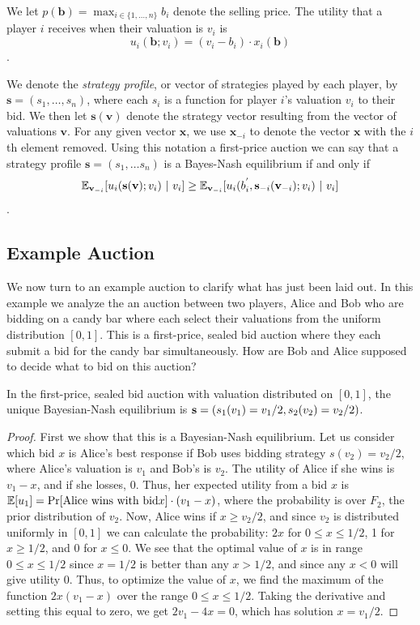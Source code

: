 \documentclass[12pt,twoside]{reedthesis}
\begin{document}
We let $p(\textbf{b}) = \max_{i \in \{1, \ldots, n\} } b_i$ denote the selling price. The utility that a player $i$ receives when their valuation is $v_i$ is 
$$u_i(\textbf{b}; v_i) = (v_i - b_i) \cdot x_i(\textbf{b})$$. 

We denote the {\em strategy profile}, or vector of strategies played by each player, by $\textbf{s} = (s_1, \ldots, s_n)$, where each $s_i$ is a function for player $i$'s valuation $v_i$ to their bid. We then let $\textbf{s}(\textbf{v})$ denote the strategy vector resulting from the vector of valuations $\textbf{v}$. For any given vector $\textbf{x}$, we use $\textbf{x}_{-i}$ to denote the vector $\textbf{x}$ with the $i$th element removed. Using this notation a first-price auction we can say that a strategy profile $\textbf{s} = (s_1, \ldots s_n)$ is a Bayes-Nash equilibrium if and only if 
$$ \mathbb{E}_{\textbf{v}_{-i}} [u_i(\textbf{s} (\textbf{v}); v_i) \ | \ v_i] \geq \mathbb{E}_{\textbf{v}_{-i}} [u_i(b^{'}_i, \textbf{s}_{-i}(\textbf{v}_{-i}); v_i) \ | \ v_i] $$\citep{Roughgarden2017}.

\subsection{Example Auction}
We now turn to an example auction to clarify what has just been laid out. In this example we analyze the an auction between two players, Alice and Bob who are bidding on a candy bar where each select their valuations from the uniform distribution $[0,1]$. This is a first-price, sealed bid auction where they each submit a bid for the candy bar simultaneously. How are Bob and Alice supposed to decide what to bid on this auction? 

\begin{prop}
	In the first-price, sealed bid auction with valuation distributed on $[0,1]$, the unique Bayesian-Nash equilibrium is $\textbf{s} = (s_1(v_1) = v_1 / 2, s_2(v_2) = v_2 / 2)$.
\end{prop}

\begin{proof}{\citep{Nisan2007}}
	First we show that this is a Bayesian-Nash equilibrium. Let us consider which bid $x$ is Alice's best response if Bob uses bidding strategy $s(v_2) = v_2/2$, where Alice's valuation is $v_1$ and Bob's is $v_2$. The utility of Alice if she wins is $v_1 - x$, and if she losses, $0$. Thus, her expected utility from a bid $x$ is $\mathbb{E}[u_1] = \Pr[\text{Alice wins with bid} x] \cdot (v_1 -x)$, where the probability is over $F_2$, the prior distribution of $v_2$. Now, Alice wins if $x \geq v_2/2$, and since $v_2$ is distributed uniformly in $[0,1]$ we can calculate the probability: $2x$ for $0 \leq x \leq 1/2$, 1 for $ x \geq 1/2$, and $0$ for $x \leq 0$. We see that the optimal value of $x$ is in range $0 \leq x \leq 1/2$ since $x = 1/2$ is better than any $x > 1/2$, and since any $x < 0$ will give utility $0$. Thus, to optimize the value of $x$, we find the maximum of the function $2x(v_1 - x)$ over the range $0 \leq x \leq 1/2$. Taking the derivative and setting this equal to zero, we get $2v_1 - 4x = 0$, which has solution $x = v_1/2$.
\end{proof}
\end{document}
